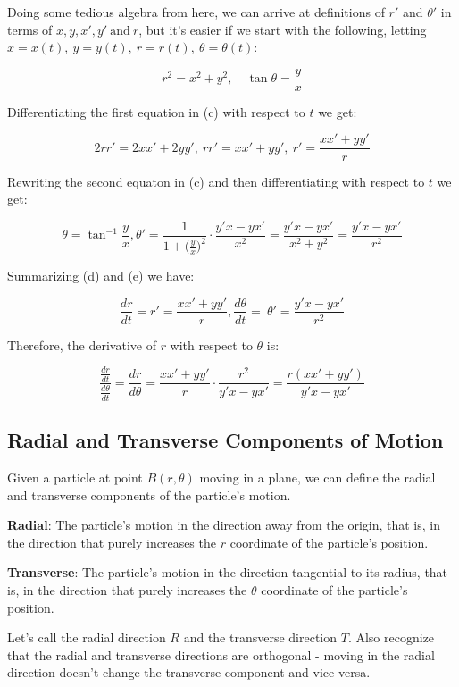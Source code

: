 \documentclass{article}
\begin{document}
Doing some tedious algebra from here, we can arrive at definitions of $r'$ and $\theta'$ in terms of $x, y, x', y' ~\text{and}~r$, but it's easier if we start with the following, letting $x=x(t), ~ y=y(t), ~ r=r(t), ~\theta = \theta(t)$:

\[ r^2 = x^2 + y^2, \quad \tan\theta = \frac{y}{x} \tag{c} \]

Differentiating the first equation in (c) with respect to $t$ we get:

\[ 2rr' = 2xx' + 2yy', ~rr' = xx' + yy', ~ r' = \frac{xx' + yy'}{r} \tag{d} \]

Rewriting the second equaton in (c) and then differentiating with respect to $t$ we get:

\[ \theta = \tan^{-1}\frac{y}{x}, \theta' = \frac{1}{1 + {(\frac{y}{x}})^2} \cdot \frac{y'x-yx'}{x^2} = \frac{y'x-yx'}{x^2 + y^2} = \frac{y'x - yx'}{r^2} \tag{e} \]

Summarizing (d) and (e) we have:

\[ \frac{dr}{dt} = r' = \frac{xx' + yy'}{r}, \frac{d\theta}{dt} = ~\theta' = \frac{y'x - yx'}{r^2} \tag{f} \]

Therefore, the derivative of $r$ with respect to $\theta$ is:

\[ \frac{\frac{dr}{dt}}{\frac{d\theta}{dt}} = \frac{dr}{d\theta} = \frac{xx' + yy'}{r} \cdot \frac{r^2}{y'x - yx'} = \frac{r(xx' + yy')}{y'x - yx'} \]

\subsection{Radial and Transverse Components of Motion}

Given a particle at point $B(r,\theta)$ moving in a plane, we can define the radial and transverse components of the particle's motion.

\textbf{Radial}: The particle's motion in the direction away from the origin, that is, in the direction that purely increases the $r$ coordinate of the particle's position.

\textbf{Transverse}: The particle's motion in the direction tangential to its radius, that is, in the direction that purely increases the $\theta$ coordinate of the particle's position.

Let's call the radial direction $R$ and the transverse direction $T$. Also recognize that the radial and transverse directions are \@{orthogonal} - moving in the radial direction doesn't change the transverse component and vice versa. 
\end{document}
